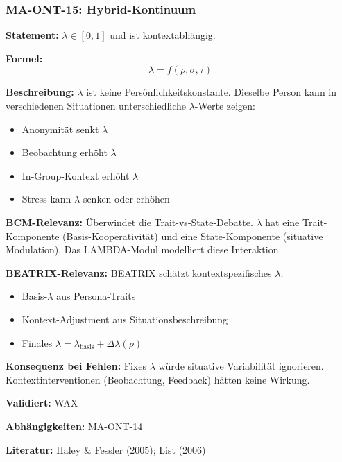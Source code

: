 \subsubsection*{MA-ONT-15: Hybrid-Kontinuum}

\textbf{Statement:} $\lambda \in [0, 1]$ und ist kontextabhängig.

\textbf{Formel:}
\begin{equation}
\lambda = f(\rho, \sigma, \tau)
\end{equation}

\textbf{Beschreibung:}
$\lambda$ ist keine Persönlichkeitskonstante. Dieselbe Person kann in verschiedenen Situationen unterschiedliche $\lambda$-Werte zeigen:
\begin{itemize}
    \item Anonymität senkt $\lambda$
    \item Beobachtung erhöht $\lambda$
    \item In-Group-Kontext erhöht $\lambda$
    \item Stress kann $\lambda$ senken oder erhöhen
\end{itemize}

\textbf{BCM-Relevanz:}
Überwindet die Trait-vs-State-Debatte. $\lambda$ hat eine Trait-Komponente (Basis-Kooperativität) und eine State-Komponente (situative Modulation). Das LAMBDA-Modul modelliert diese Interaktion.

\textbf{BEATRIX-Relevanz:}
BEATRIX schätzt kontextspezifisches $\lambda$:
\begin{itemize}
    \item Basis-$\lambda$ aus Persona-Traits
    \item Kontext-Adjustment aus Situationsbeschreibung
    \item Finales $\lambda = \lambda_{\text{basis}} + \Delta\lambda(\rho)$
\end{itemize}

\textbf{Konsequenz bei Fehlen:}
Fixes $\lambda$ würde situative Variabilität ignorieren. Kontextinterventionen (Beobachtung, Feedback) hätten keine Wirkung.

\textbf{Validiert:} WAX

\textbf{Abhängigkeiten:} MA-ONT-14

\textbf{Literatur:} Haley \& Fessler (2005); List (2006)


